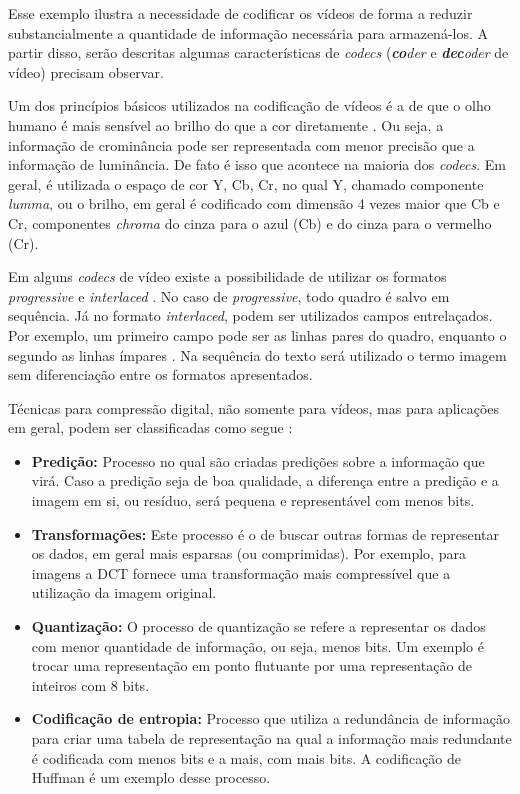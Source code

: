 \documentclass[cic,tc]{iiufrgs}
\begin{document}
Esse exemplo ilustra a necessidade de codificar os vídeos de forma a
reduzir substancialmente a quantidade de informação necessária para armazená-los.
A partir disso, serão descritas algumas características de \textit{codecs} 
(\emph{\textbf{co}der} e \emph{\textbf{dec}oder} de vídeo) precisam observar.

Um dos princípios básicos utilizados na codificação de vídeos é a de que o olho humano
é mais sensível ao brilho do que a cor diretamente \cite{SullivanH264}.
Ou seja, a informação de crominância pode ser representada com menor precisão que 
a informação de luminância.
De fato é isso que acontece na maioria dos \emph{codecs}. 
Em geral, é utilizada o espaço de cor Y, Cb, Cr, no qual Y, chamado componente \emph{lumma},
ou o brilho, em geral é codificado com dimensão 4 vezes maior que Cb e Cr, componentes 
\emph{chroma} do cinza para o azul (Cb) e do cinza para o vermelho (Cr).

Em alguns \emph{codecs} de vídeo existe a possibilidade de utilizar os formatos
\emph{progressive} e \emph{interlaced} \cite{SullivanH264}.
No caso de \emph{progressive}, todo quadro é salvo em sequência.
Já no formato \emph{interlaced}, podem ser utilizados campos entrelaçados.
Por exemplo, um primeiro campo pode ser as linhas pares do quadro, enquanto o segundo
as linhas ímpares \cite{SullivanH264}.
Na sequência do texto será utilizado o termo imagem sem diferenciação entre os 
formatos apresentados.

Técnicas para compressão digital, não somente para vídeos, mas para aplicações em geral,
podem ser classificadas como segue \cite{SullivanH264}:
\begin{itemize}
    \item \textbf{Predição:} Processo no qual são criadas predições sobre a informação 
    que virá. Caso a predição seja de boa qualidade, a diferença entre a predição e a 
    imagem em si, ou resíduo, será pequena e representável com menos bits.
    \item \textbf{Transformações:} Este processo é o de buscar outras formas de representar
    os dados, em geral mais esparsas (ou comprimidas). Por exemplo, para imagens a DCT 
    fornece uma transformação mais compressível que a utilização da imagem original.
    \item \textbf{Quantização:} O processo de quantização se refere a representar os dados
    com menor quantidade de informação, ou seja, menos bits. Um exemplo é trocar uma representação 
    em ponto flutuante por uma representação de inteiros com 8 bits.
    \item \textbf{Codificação de entropia:} Processo que utiliza a redundância de informação para 
    criar uma tabela de representação na qual a informação mais redundante é codificada
    com menos bits e a mais, com mais bits. A codificação de Huffman é um exemplo desse processo.
\end{itemize}
\end{document}
